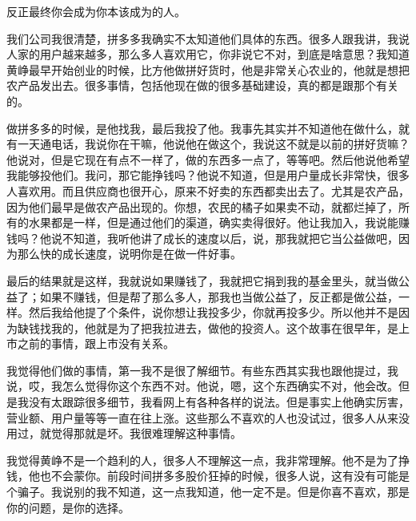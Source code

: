 
反正最终你会成为你本该成为的人。



我们公司我很清楚，拼多多我确实不太知道他们具体的东西。很多人跟我讲，我说人家的用户越来越多，那么多人喜欢用它，你非说它不对，到底是啥意思？我知道黄峥最早开始创业的时候，比方他做拼好货时，他是非常关心农业的，他就是想把农产品发出去。很多事情，包括他现在做的很多基础建设，真的都是跟那个有关的。

做拼多多的时候，是他找我，最后我投了他。我事先其实并不知道他在做什么，就有一天通电话，我说你在干嘛，他说他在做这个，我说这不就是以前的拼好货嘛？他说对，但是它现在有点不一样了，做的东西多一点了，等等吧。然后他说他希望我能够投他们。我问，那它能挣钱吗？他说不知道，但是用户量成长非常快，很多人喜欢用。而且供应商也很开心，原来不好卖的东西都卖出去了。尤其是农产品，因为他们最早是做农产品出现的。你想，农民的橘子如果卖不动，就都烂掉了，所有的水果都是一样，但是通过他们的渠道，确实卖得很好。他让我加入，我说能赚钱吗？他说不知道，我听他讲了成长的速度以后，说，那我就把它当公益做吧，因为那么快的成长速度，说明你是在做一件好事。

最后的结果就是这样，我就说如果赚钱了，我就把它捐到我的基金里头，就当做公益了；如果不赚钱，但是帮了那么多人，那我也当做公益了，反正都是做公益，一样。然后我给他提了个条件，说你想让我投多少，你就再投多少。所以他并不是因为缺钱找我的，他就是为了把我拉进去，做他的投资人。这个故事在很早年，是上市之前的事情，跟上市没有关系。

我觉得他们做的事情，第一我不是很了解细节。有些东西其实我也跟他提过，我说，哎，我怎么觉得你这个东西不对。他说，嗯，这个东西确实不对，他会改。但是我没有太跟踪很多细节，我看网上有各种各样的说法。但是事实上他确实厉害，营业额、用户量等等一直在往上涨。这些那么不喜欢的人也没试过，很多人从来没用过，就觉得那就是坏。我很难理解这种事情。


我觉得黄峥不是一个趋利的人，很多人不理解这一点，我非常理解。他不是为了挣钱，他也不会蒙你。前段时间拼多多股价狂掉的时候，很多人说，这有没有可能是个骗子。我说别的我不知道，这一点我知道，他一定不是。但是你喜不喜欢，那是你的问题，是你的选择。

